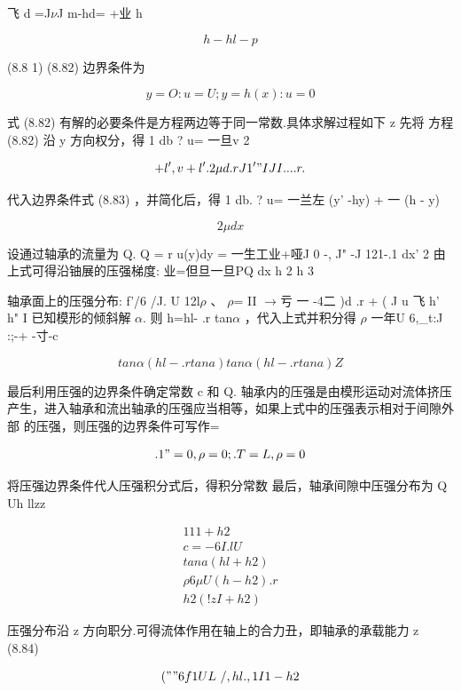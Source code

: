 飞 d =J$\nu$J m-hd= +业 h

\[h-hl-p\]

(8.8 1) (8.82) 边界条件为

\begin{equation*}y = O:u = U; y = h(x):u = 0\tag{8.83}\end{equation*}

式 (8.82) 有解的必要条件是方程两边等于同一常数.具体求解过程如下 z 先将 方程 (8.82) 沿 y 方向权分，得 1 db ? u= 一旦v 2

\[+ l', v + l'. 2\mu d.rJ 1'" I J I ....r.\]

代入边界条件式 (8.83) ，并简化后，得 1 db. ? u= 一兰左 (y' -hy) + 一 (h - y)

\[2\mu dx\]

设通过轴承的流量为 Q. Q = r u(y)dy = 一生工业+哑J 0 -, J" -J 121-.1 dx' 2 由上式可得沿铀展的压强梯度: 业=但旦一旦PQ dx h 2 h 3

轴承面上的压强分布: f'/6 /J. U 12l$\rho$ 、 $\rho$= II $\rightarrow$亏 一 -4二 )d .r + ( J u 飞 h' h" I 已知模形的倾斜解 $\alpha$. 则 h=hl- .r tan$\alpha$ ，代入上式并积分得 $\rho$ 一年U 6,\_t:J :;-+ -寸-c

\[tan\alpha  (h l - .rtana) tan\alpha  (h l - .rtana)Z\]

最后利用压强的边界条件确定常数 c 和 Q. 轴承内的压强是由模形运动对流体挤压 产生，进入轴承和流出轴承的压强应当相等，如果上式中的压强表示相对于间隙外部 的压强，则压强的边界条件可写作=

\[.1" = 0 ,  \rho =0; .T =L ,  \rho =0\]

将压强边界条件代人压强积分式后，得积分常数 最后，轴承间隙中压强分布为 Q Uh llzz

\begin{gather*}
11 1 +h2\\
c =- 6I.lU\\
tana(h l + h 2 )\\
\rho 6\mu U(h - h 2 ).r\\
h 2( !z I+h 2)
\end{gather*}

压强分布沿 z 方向职分.可得流体作用在轴上的合力丑，即轴承的承载能力 z (8.84)

\[("" 6 f1 UL~ /, hl .,1I1 -h2  \]

